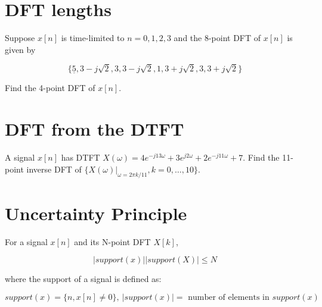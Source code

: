 \documentclass[11pt]{article}
\begin{document}
\section{DFT lengths}

Suppose $x[n]$ is time-limited to $n=0,1, 2, 3$ and the 8-point DFT of $x[n]$ is given by

\[ \{\underline{5}, 3-j\sqrt{2}, 3, 3-j\sqrt{2}, 1, 3+j\sqrt{2}, 3, 3+j\sqrt{2} \} \]

Find the 4-point DFT of $x[n]$.

\section{DFT from the DTFT}

A signal $x[n]$ has DTFT $X(\omega) = 4e^{-j13 \omega} + 3e^{j2\omega} + 2e^{-j11\omega}+7$. Find the 11-point inverse DFT of $\{X(\omega)\big|_{\omega = 2 \pi k /11}, k = 0,\ldots, 10\}$.

\section{Uncertainty Principle}

For a signal $x[n]$ and its N-point DFT $X[k]$, 

\[ |support(x)||support(X)| \leq N \]

where the support of a signal is defined as:

\[ support(x)=\{n, x[n] \neq 0\},\ |support(x)| = \text{ number of elements in } support(x) \]
\end{document}
